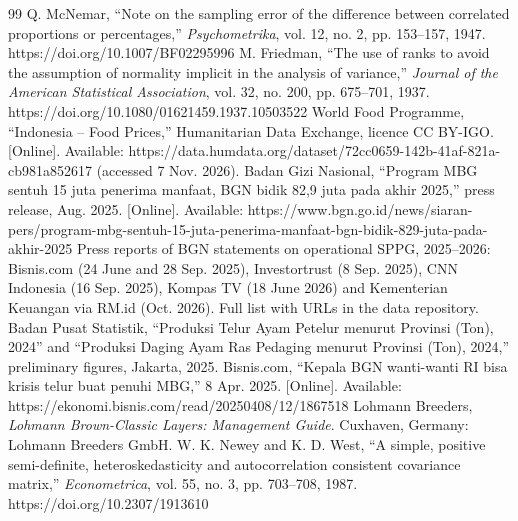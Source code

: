 \documentclass[10pt,twocolumn,a4paper]{article}
\begin{document}
\begin{thebibliography}{99}
 Q. McNemar, ``Note on the sampling error of the difference between correlated proportions or percentages,'' \textit{Psychometrika}, vol. 12, no. 2, pp. 153--157, 1947. https://doi.org/10.1007/BF02295996
 M. Friedman, ``The use of ranks to avoid the assumption of normality implicit in the analysis of variance,'' \textit{Journal of the American Statistical Association}, vol. 32, no. 200, pp. 675--701, 1937. https://doi.org/10.1080/01621459.1937.10503522
 World Food Programme, ``Indonesia -- Food Prices,'' Humanitarian Data Exchange, licence CC BY-IGO. [Online]. Available: https://data.humdata.org/dataset/72cc0659-142b-41af-821a-cb981a852617 (accessed 7 Nov. 2026).
 Badan Gizi Nasional, ``Program MBG sentuh 15 juta penerima manfaat, BGN bidik 82,9 juta pada akhir 2025,'' press release, Aug. 2025. [Online]. Available: https://www.bgn.go.id/news/siaran-pers/program-mbg-sentuh-15-juta-penerima-manfaat-bgn-bidik-829-juta-pada-akhir-2025
 Press reports of BGN statements on operational SPPG, 2025--2026: Bisnis.com (24 June and 28 Sep. 2025), Investortrust (8 Sep. 2025), CNN Indonesia (16 Sep. 2025), Kompas TV (18 June 2026) and Kementerian Keuangan via RM.id (Oct. 2026). Full list with URLs in the data repository.
 Badan Pusat Statistik, ``Produksi Telur Ayam Petelur menurut Provinsi (Ton), 2024'' and ``Produksi Daging Ayam Ras Pedaging menurut Provinsi (Ton), 2024,'' preliminary figures, Jakarta, 2025.
 Bisnis.com, ``Kepala BGN wanti-wanti RI bisa krisis telur buat penuhi MBG,'' 8 Apr. 2025. [Online]. Available: https://ekonomi.bisnis.com/read/20250408/12/1867518
 Lohmann Breeders, \textit{Lohmann Brown-Classic Layers: Management Guide}. Cuxhaven, Germany: Lohmann Breeders GmbH.
 W. K. Newey and K. D. West, ``A simple, positive semi-definite, heteroskedasticity and autocorrelation consistent covariance matrix,'' \textit{Econometrica}, vol. 55, no. 3, pp. 703--708, 1987. https://doi.org/10.2307/1913610
\end{thebibliography}

\onecolumn
\appendix
\end{document}
